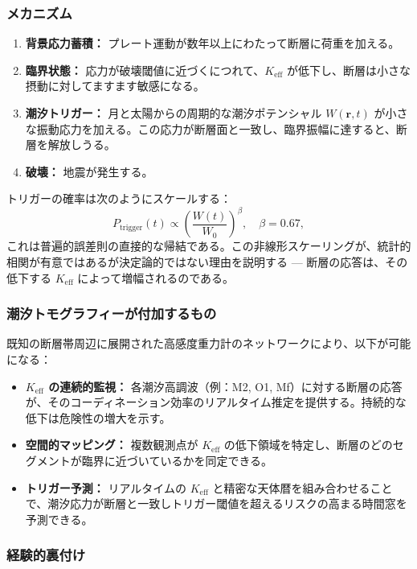 \documentclass[12pt,a4paper]{article}
\theoremstyle{remark}
\begin{document}
	\subsubsection{メカニズム}
	
	\begin{enumerate}
		\item \textbf{背景応力蓄積：} プレート運動が数年以上にわたって断層に荷重を加える。
		\item \textbf{臨界状態：} 応力が破壊閾値に近づくにつれて、\(K_{\mathrm{eff}}\) が低下し、断層は小さな摂動に対してますます敏感になる。
		\item \textbf{潮汐トリガー：} 月と太陽からの周期的な潮汐ポテンシャル \(W(\mathbf{r},t)\) が小さな振動応力を加える。この応力が断層面と一致し、臨界振幅に達すると、断層を解放しうる。
		\item \textbf{破壊：} 地震が発生する。
	\end{enumerate}
	
	トリガーの確率は次のようにスケールする：
	\[
	P_{\text{trigger}}(t) \propto \left( \frac{W(t)}{W_0} \right)^{\beta}, \quad \beta = 0.67,
	\]
	これは普遍的誤差則の直接的な帰結である。この非線形スケーリングが、統計的相関が有意ではあるが決定論的ではない理由を説明する — 断層の応答は、その低下する \(K_{\mathrm{eff}}\) によって増幅されるのである。
	
	\subsubsection{潮汐トモグラフィーが付加するもの}
	
	既知の断層帯周辺に展開された高感度重力計のネットワークにより、以下が可能になる：
	
	\begin{itemize}
		\item \textbf{\(K_{\mathrm{eff}}\) の連続的監視：} 各潮汐高調波（例：M2, O1, Mf）に対する断層の応答が、そのコーディネーション効率のリアルタイム推定を提供する。持続的な低下は危険性の増大を示す。
		\item \textbf{空間的マッピング：} 複数観測点が \(K_{\mathrm{eff}}\) の低下領域を特定し、断層のどのセグメントが臨界に近づいているかを同定できる。
		\item \textbf{トリガー予測：} リアルタイムの \(K_{\mathrm{eff}}\) と精密な天体暦を組み合わせることで、潮汐応力が断層と一致しトリガー閾値を超えるリスクの高まる時間窓を予測できる。
	\end{itemize}
	
	\subsubsection{経験的裏付け}
	
\end{document}
